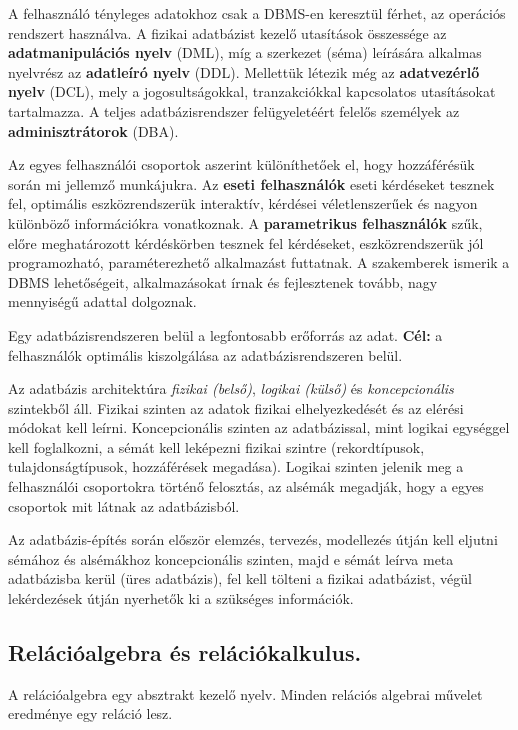 A felhasználó tényleges adatokhoz csak a DBMS-en keresztül férhet, az operációs rendszert használva. A fizikai adatbázist kezelő utasítások összessége az \textbf{adatmanipulációs nyelv} (DML), míg a szerkezet (séma) leírására alkalmas nyelvrész az \textbf{adatleíró nyelv} (DDL). Mellettük létezik még az \textbf{adatvezérlő nyelv} (DCL), mely a jogosultságokkal, tranzakciókkal kapcsolatos utasításokat tartalmazza. A teljes adatbázisrendszer felügyeletéért felelős személyek az \textbf{adminisztrátorok} (DBA).

Az egyes felhasználói csoportok aszerint különíthetőek el, hogy hozzáférésük során mi jellemző munkájukra. Az \textbf{eseti felhasználók} eseti kérdéseket tesznek fel, optimális eszközrendszerük interaktív, kérdései véletlenszerűek és nagyon különböző információkra vonatkoznak. A \textbf{parametrikus felhasználók} szűk, előre meghatározott kérdéskörben tesznek fel kérdéseket, eszközrendszerük jól programozható, paraméterezhető alkalmazást futtatnak. A szakemberek ismerik a DBMS lehetőségeit, alkalmazásokat írnak és fejlesztenek tovább, nagy mennyiségű adattal dolgoznak.

Egy adatbázisrendszeren belül a legfontosabb erőforrás az adat.
\textbf{Cél:} a felhasználók optimális kiszolgálása az adatbázisrendszeren belül.

Az adatbázis architektúra \emph{fizikai (belső)}, \emph{logikai (külső)} és \emph{koncepcionális} szintekből áll. Fizikai szinten az adatok fizikai elhelyezkedését és az elérési módokat kell leírni. Koncepcionális szinten az adatbázissal, mint logikai egységgel kell foglalkozni, a sémát kell leképezni fizikai szintre (rekordtípusok, tulajdonságtípusok, hozzáférések megadása). Logikai szinten jelenik meg a felhasználói csoportokra történő felosztás, az alsémák megadják, hogy a egyes csoportok mit látnak az adatbázisból.

Az adatbázis-építés során először elemzés, tervezés, modellezés útján kell eljutni sémához és alsémákhoz koncepcionális szinten, majd e sémát leírva meta adatbázisba kerül (üres adatbázis), fel kell tölteni a fizikai adatbázist, végül lekérdezések útján nyerhetők ki a szükséges információk.

\subsection{Relációalgebra és relációkalkulus.}
A relációalgebra egy absztrakt kezelő nyelv. Minden relációs algebrai művelet eredménye egy reláció lesz.

